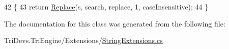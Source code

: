 \begin{DoxyCode}
42         \{
43             \textcolor{keywordflow}{return} \hyperlink{class_tri_devs_1_1_tri_engine_1_1_extensions_1_1_string_extensions_a5577f5dbd781157c2af561a594d7e4b4}{Replace}(s, search, replace, 1, caseInsensitive);
44         \}
\end{DoxyCode}


The documentation for this class was generated from the following file\-:\begin{DoxyCompactItemize}
\item 
Tri\-Devs.\-Tri\-Engine/\-Extensions/\hyperlink{_string_extensions_8cs}{String\-Extensions.\-cs}\end{DoxyCompactItemize}
